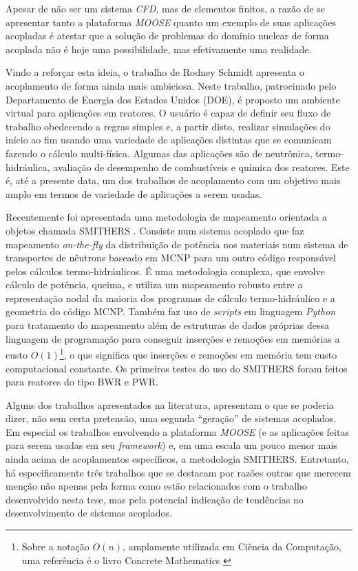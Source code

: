 Apesar de não ser um sistema \textit{CFD}, mas de elementos finitos, a razão de se
apresentar tanto a plataforma \textit{MOOSE} quanto um exemplo de suas aplicações
acopladas é atestar que a solução de problemas do domínio nuclear de forma
acoplada não é hoje uma possibilidade, mas efetivamente uma realidade.

Vindo a reforçar esta ideia, o trabalho de Rodney Schmidt \cite{Schmidt2015} apresenta o acoplamento
de forma ainda mais ambiciosa. Neste trabalho, patrocinado pelo Departamento de Energia dos Estados
Unidos (DOE), é proposto um ambiente virtual para aplicações em reatores. O usuário é capaz de definir
seu fluxo de trabalho obedecendo a regras simples e, a partir disto, realizar simulações do início ao
fim usando uma variedade de aplicações distintas que se comunicam fazendo o cálculo multi-física. Algumas
das aplicações são de neutrônica, termo-hidráulica, avaliação de desempenho de combustíveis e química
dos reatores. Este é, até a presente data, um dos trabalhos de acoplamento com um objetivo mais amplo
em termos de variedade de aplicações a serem usadas.

Recentemente foi apresentada uma metodologia de mapeamento orientada a objetos chamada
SMITHERS \cite{Richard2015}. Consiste num sistema acoplado que faz mapeamento \textit{on-the-fly}
da distribuição de potência nos materiais num sistema de transportes de nêutrons baseado
em MCNP para um outro código responsável pelos cálculos termo-hidráulicos. É uma metodologia
complexa, que envolve cálculo de potência, queima, e utiliza um mapeamento robusto entre
a representação nodal da maioria dos programas de cálculo termo-hidráulico e a geometria
do código MCNP. Também faz uso de \textit{scripts} em linguagem \textit{Python} para
tratamento do mapeamento além de estruturas de dados próprias dessa linguagem de programação
para conseguir inserções e remoções em memórias a custo $O(1)$\footnote{Sobre a notação $O(n)$, amplamente utilizada em Ciência da Computação, uma
  referência é o livro Concrete Mathematics \cite[Seção~9.2]{Graham1994}}, o que significa
que inserções e remoções em memória tem custo computacional constante.
Os primeiros testes do uso do SMITHERS foram feitos para reatores do tipo BWR e
PWR.

Alguns dos trabalhos apresentados na literatura, apresentam o que se poderia dizer,
não sem certa pretensão, uma segunda ``geração'' de sistemas acoplados. Em especial os trabalhos
envolvendo a plataforma \textit{MOOSE} (e as aplicações feitas para serem usadas em seu
\textit{framework}) e, em uma escala um pouco menor mais ainda acima de acoplamentos específicos,
a metodologia SMITHERS. Entretanto, há especificamente três trabalhos que se destacam por razões outras que
merecem menção não apenas pela forma como estão relacionados com o trabalho desenvolvido nesta tese, mas pela
potencial indicação de tendências no desenvolvimento de sistemas acoplados.

